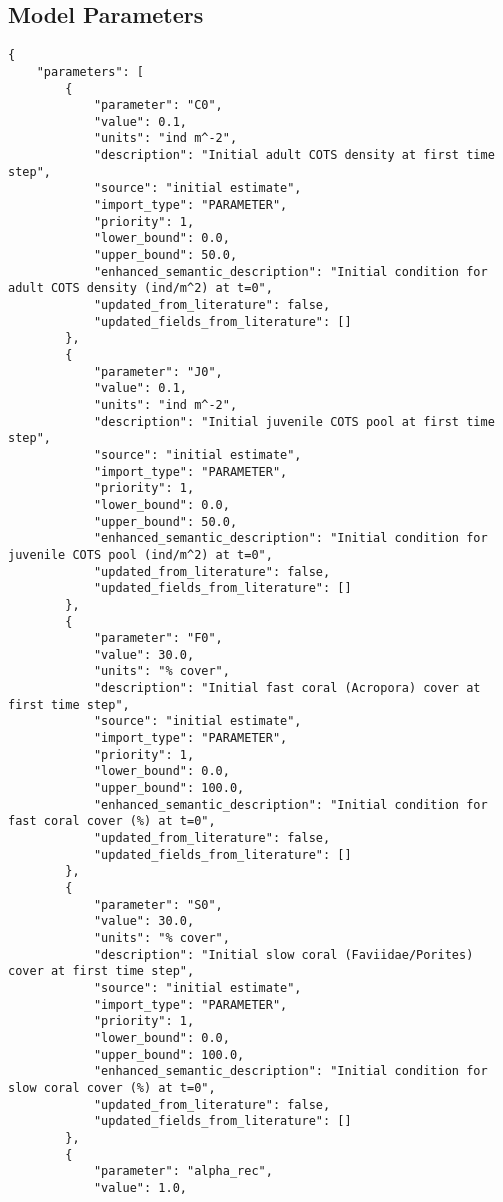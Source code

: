 \subsection{Model Parameters}
\begin{lstlisting}
{
    "parameters": [
        {
            "parameter": "C0",
            "value": 0.1,
            "units": "ind m^-2",
            "description": "Initial adult COTS density at first time step",
            "source": "initial estimate",
            "import_type": "PARAMETER",
            "priority": 1,
            "lower_bound": 0.0,
            "upper_bound": 50.0,
            "enhanced_semantic_description": "Initial condition for adult COTS density (ind/m^2) at t=0",
            "updated_from_literature": false,
            "updated_fields_from_literature": []
        },
        {
            "parameter": "J0",
            "value": 0.1,
            "units": "ind m^-2",
            "description": "Initial juvenile COTS pool at first time step",
            "source": "initial estimate",
            "import_type": "PARAMETER",
            "priority": 1,
            "lower_bound": 0.0,
            "upper_bound": 50.0,
            "enhanced_semantic_description": "Initial condition for juvenile COTS pool (ind/m^2) at t=0",
            "updated_from_literature": false,
            "updated_fields_from_literature": []
        },
        {
            "parameter": "F0",
            "value": 30.0,
            "units": "% cover",
            "description": "Initial fast coral (Acropora) cover at first time step",
            "source": "initial estimate",
            "import_type": "PARAMETER",
            "priority": 1,
            "lower_bound": 0.0,
            "upper_bound": 100.0,
            "enhanced_semantic_description": "Initial condition for fast coral cover (%) at t=0",
            "updated_from_literature": false,
            "updated_fields_from_literature": []
        },
        {
            "parameter": "S0",
            "value": 30.0,
            "units": "% cover",
            "description": "Initial slow coral (Faviidae/Porites) cover at first time step",
            "source": "initial estimate",
            "import_type": "PARAMETER",
            "priority": 1,
            "lower_bound": 0.0,
            "upper_bound": 100.0,
            "enhanced_semantic_description": "Initial condition for slow coral cover (%) at t=0",
            "updated_from_literature": false,
            "updated_fields_from_literature": []
        },
        {
            "parameter": "alpha_rec",
            "value": 1.0,

\end{lstlisting}
